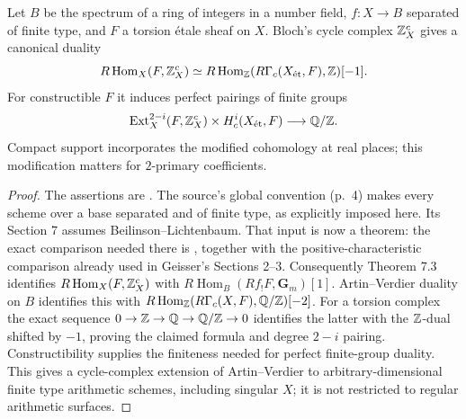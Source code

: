 \begin{theorem}\label{thm:B3-arithmetic-duality}
Let $B$ be the spectrum of a ring of integers in a number field,
$f:X\to B$ separated of finite type, and $F$ a torsion \'etale sheaf
on $X$. Bloch's cycle complex ${\mathbb{Z}}_X^c$ gives a canonical duality
\[
 R\operatorname{Hom}_X(F,{\mathbb{Z}}_X^c)
  \simeq R\operatorname{Hom}_{{\mathbb{Z}}}
       (R\Gamma_c(X_{\mathrm{\acute et}},F),{\mathbb{Z}})[-1].
\]
For constructible $F$ it induces perfect pairings of finite groups
\[
 \operatorname{Ext}^{2-i}_X(F,{\mathbb{Z}}_X^c)
     \times H_c^i(X_{\mathrm{\acute et}},F)\longrightarrow{\ensuremath{\mathbb{Q}}}/{\mathbb{Z}}.
\]
Compact support incorporates the modified cohomology at real places;
this modification matters for $2$-primary coefficients.
\end{theorem}
\begin{proof}
The assertions are \cite[Theorem 7.8 and Section 7.2]{BGeisser}.
The source's global convention (p.~4) makes every scheme over a base
separated and of finite type, as explicitly imposed here.
Its Section 7 assumes Beilinson--Lichtenbaum. That input is now a
theorem: the exact comparison needed there is
\cite[Theorem 6.17]{BVoevodsky2011}, together with the
positive-characteristic comparison already used in Geisser's
Sections 2--3. Consequently Theorem 7.3 identifies
$R\operatorname{Hom}_X(F,{\mathbb{Z}}_X^c)$ with
$R\operatorname{Hom}_B(Rf_!F,\mathbf G_m)[1]$.
Artin--Verdier duality on $B$ identifies this with
$R\operatorname{Hom}_{{\mathbb{Z}}}(R\Gamma_c(X,F),{\mathbb{Q}}/{\mathbb{Z}})[-2]$.
For a torsion complex the exact sequence
$0\to{\ensuremath{\mathbb{Z}}}\to{\ensuremath{\mathbb{Q}}}\to{\ensuremath{\mathbb{Q}}}/{\mathbb{Z}}\to0$ identifies the latter with the
${\mathbb{Z}}$-dual shifted by $-1$, proving the claimed formula and degree
$2-i$ pairing. Constructibility supplies the finiteness needed for
perfect finite-group duality. This gives a cycle-complex extension of
Artin--Verdier to arbitrary-dimensional finite type arithmetic schemes,
including singular $X$; it is not restricted to regular arithmetic
surfaces.
\end{proof}

